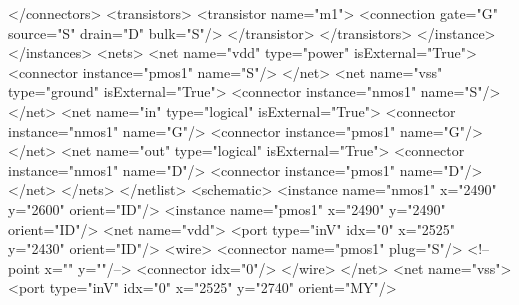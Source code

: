 \begin{DoxyCodeInclude}
        </connectors>
        <transistors>
          <transistor name=\textcolor{stringliteral}{"m1"}>
            <connection gate=\textcolor{stringliteral}{"G"} source=\textcolor{stringliteral}{"S"} drain=\textcolor{stringliteral}{"D"} bulk=\textcolor{stringliteral}{"S"}/>
          </transistor>
        </transistors>
      </instance>
    </instances>
    <nets>
      <net name=\textcolor{stringliteral}{"vdd"} type=\textcolor{stringliteral}{"power"} isExternal=\textcolor{stringliteral}{"True"}>
        <connector instance=\textcolor{stringliteral}{"pmos1"} name=\textcolor{stringliteral}{"S"}/>
      </net>
      <net name=\textcolor{stringliteral}{"vss"} type=\textcolor{stringliteral}{"ground"} isExternal=\textcolor{stringliteral}{"True"}>
        <connector instance=\textcolor{stringliteral}{"nmos1"} name=\textcolor{stringliteral}{"S"}/>
      </net>
      <net name=\textcolor{stringliteral}{"in"} type=\textcolor{stringliteral}{"logical"} isExternal=\textcolor{stringliteral}{"True"}>
        <connector instance=\textcolor{stringliteral}{"nmos1"} name=\textcolor{stringliteral}{"G"}/>
        <connector instance=\textcolor{stringliteral}{"pmos1"} name=\textcolor{stringliteral}{"G"}/>
      </net>
      <net name=\textcolor{stringliteral}{"out"} type=\textcolor{stringliteral}{"logical"} isExternal=\textcolor{stringliteral}{"True"}>
        <connector instance=\textcolor{stringliteral}{"nmos1"} name=\textcolor{stringliteral}{"D"}/>
        <connector instance=\textcolor{stringliteral}{"pmos1"} name=\textcolor{stringliteral}{"D"}/>
      </net>
    </nets>
  </netlist>
  <schematic>
    <instance name=\textcolor{stringliteral}{"nmos1"} x=\textcolor{stringliteral}{"2490"} y=\textcolor{stringliteral}{"2600"} orient=\textcolor{stringliteral}{"ID"}/>
    <instance name=\textcolor{stringliteral}{"pmos1"} x=\textcolor{stringliteral}{"2490"} y=\textcolor{stringliteral}{"2490"} orient=\textcolor{stringliteral}{"ID"}/>
    <net name=\textcolor{stringliteral}{"vdd"}>
      <port type=\textcolor{stringliteral}{"inV"} idx=\textcolor{stringliteral}{"0"} x=\textcolor{stringliteral}{"2525"} y=\textcolor{stringliteral}{"2430"} orient=\textcolor{stringliteral}{"ID"}/>
      <wire>
        <connector name=\textcolor{stringliteral}{"pmos1"} plug=\textcolor{stringliteral}{"S"}/>
        <!--point x=\textcolor{stringliteral}{""} y=\textcolor{stringliteral}{""}/-->
        <connector idx=\textcolor{stringliteral}{"0"}/>
      </wire>
    </net>
    <net name=\textcolor{stringliteral}{"vss"}>
      <port type=\textcolor{stringliteral}{"inV"} idx=\textcolor{stringliteral}{"0"} x=\textcolor{stringliteral}{"2525"} y=\textcolor{stringliteral}{"2740"} orient=\textcolor{stringliteral}{"MY"}/>

\end{DoxyCodeInclude}
